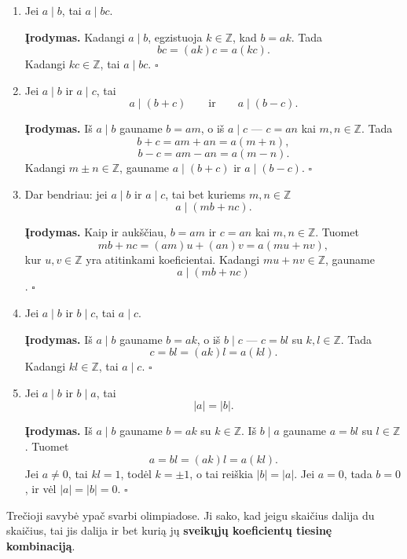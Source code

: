 \documentclass[11pt,a4paper]{scrartcl}
\begin{document}
\begin{enumerate}
    \renewcommand{\labelenumi}{\textbf{\theenumi.}}

    \item Jei $a\mid b$, tai $a\mid bc$.

    \textbf{Įrodymas.} Kadangi $a\mid b$, egzistuoja $k\in\mathbb Z$, kad
    $b=ak$. Tada
    \[
    bc=(ak)c=a(kc).
    \]
    Kadangi $kc\in\mathbb Z$, tai $a\mid bc$.
    \hfill $\square$

    \item Jei $a\mid b$ ir $a\mid c$, tai
    \[
    a\mid (b+c)
    \qquad\text{ir}\qquad
    a\mid (b-c).
    \]

    \textbf{Įrodymas.} Iš $a\mid b$ gauname $b=am$, o iš $a\mid c$ ---
    $c=an$ kai $m,n\in\mathbb Z$. Tada
    \[
    b+c=am+an=a(m+n),
    \]
    \[
    b-c=am-an=a(m-n).
    \]
    Kadangi $m\pm n\in\mathbb Z$, gauname $a\mid (b+c)$ ir $a\mid (b-c)$.
    \hfill $\square$

    \item Dar bendriau: jei $a\mid b$ ir $a\mid c$, tai bet kuriems
    $m,n\in\mathbb Z$
    \[
    a\mid (mb+nc).
    \]

    \textbf{Įrodymas.} Kaip ir aukščiau, $b=am$ ir $c=an$ kai $m,n\in\mathbb Z$.
    Tuomet
    \[
    mb+nc=(am)u+(an)v=a(mu+nv),
    \]
    kur $u,v\in\mathbb Z$ yra atitinkami koeficientai. Kadangi $mu+nv\in\mathbb Z$,
    gauname \[a\mid (mb+nc)\].
    \hfill $\square$

    \item Jei $a\mid b$ ir $b\mid c$, tai $a\mid c$.

    \textbf{Įrodymas.} Iš $a\mid b$ gauname $b=ak$, o iš $b\mid c$ ---
    $c=bl$ su $k,l\in\mathbb Z$. Tada
    \[
    c=bl=(ak)l=a(kl).
    \]
    Kadangi $kl\in\mathbb Z$, tai $a\mid c$.
    \hfill $\square$

    \item Jei $a\mid b$ ir $b\mid a$, tai
    \[
    |a|=|b|.
    \]

    \textbf{Įrodymas.} Iš $a\mid b$ gauname $b=ak$ su $k\in\mathbb Z$.
    Iš $b\mid a$ gauname $a=bl$ su $l\in\mathbb Z$. Tuomet
    \[
    a=bl=(ak)l=a(kl).
    \]
    Jei $a\neq 0$, tai $kl=1$, todėl $k=\pm 1$, o tai reiškia $|b|=|a|$.
    Jei $a=0$, tada $b=0$, ir vėl $|a|=|b|=0$.
    \hfill $\square$
\end{enumerate}

Trečioji savybė ypač svarbi olimpiadose. Ji sako, kad jeigu skaičius dalija du
skaičius, tai jis dalija ir bet kurią jų \textbf{sveikųjų koeficientų tiesinę kombinaciją}.
\end{document}
